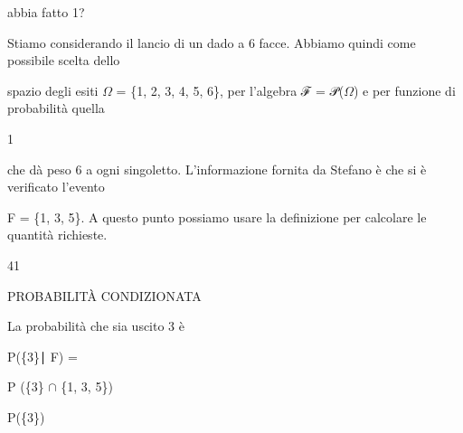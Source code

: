 \documentclass[a4paper,portrait,12pt]{article}
\begin{document}
\begin{flushleft}
abbia fatto 1?
\end{flushleft}


\begin{flushleft}
Stiamo considerando il lancio di un dado a 6 facce. Abbiamo quindi come possibile scelta dello
\end{flushleft}


\begin{flushleft}
spazio degli esiti $\Omega$ = \{1, 2, 3, 4, 5, 6\}, per l'algebra ℱ = 𝒫($\Omega$) e per funzione di probabilit\`{a} quella
\end{flushleft}


1


\begin{flushleft}
che d\`{a} peso 6 a ogni singoletto. L'informazione fornita da Stefano \`{e} che si \`{e} verificato l'evento
\end{flushleft}


\begin{flushleft}
F = \{1, 3, 5\}. A questo punto possiamo usare la definizione per calcolare le quantit\`{a} richieste.
\end{flushleft}


41










\begin{flushleft}
PROBABILIT\`{A} CONDIZIONATA
\end{flushleft}





\begin{flushleft}
La probabilit\`{a} che sia uscito 3 \`{e}
\end{flushleft}


\begin{flushleft}
P(\{3\}∣ F) =
\end{flushleft}





\begin{flushleft}
P (\{3\} $\cap$ \{1, 3, 5\})
\end{flushleft}


\begin{flushleft}
P(\{3\})
\end{flushleft}
\end{document}
